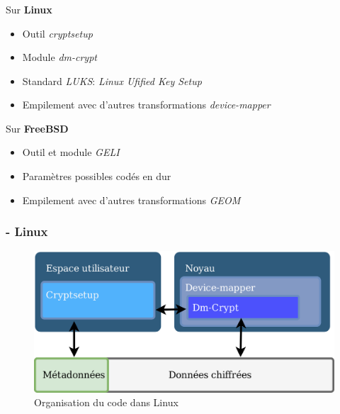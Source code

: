 \begin{frame}
  \frametitle{\insertsubsectionhead}
  \begin{block}{Sur \textbf{Linux}}
    \begin{itemize}
    \item Outil \textit{cryptsetup}
    \item Module \textit{dm-crypt}
    \item Standard \textit{LUKS}: \textit{Linux Ufified Key Setup}
    \item Empilement avec d'autres transformations \textit{device-mapper}
    \end{itemize}
  \end{block}
  \pause
  \begin{block}{Sur \textbf{FreeBSD}}
    \begin{itemize}
    \item Outil et module \textit{GELI}
    \item Paramètres possibles codés en dur
    \item Empilement avec d'autres transformations \textit{GEOM}
    \end{itemize}
  \end{block}
\end{frame}

\begin{frame}
  \frametitle{\insertsubsectionhead - \textbf{Linux}}
  \begin{figure}
    \includegraphics[width=\textwidth]{etat_art/organisation_linux}
    \caption{Organisation du code dans Linux}
  \end{figure}
\end{frame}

